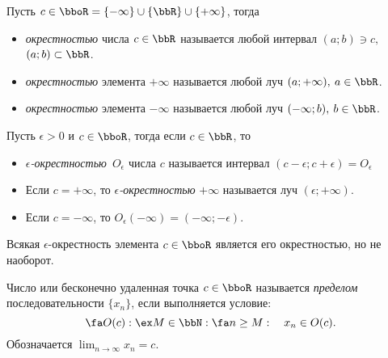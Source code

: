\begin{defn}
Пусть $c \in \bboR = \{-\infty\}\cup\{\bbR\}\cup\{+\infty\}$, тогда 
\begin{itemize}
\item
\textit{окрестностью} числа $c \in \bbR$ называется любой интервал $(a;b)\ni c,$ $(a;b) \subset \bbR$.
\item
\textit{окрестностью} элемента $+\infty$ называется любой луч      $(a;+\infty),\: a \in \bbR$.
\item
\textit{окрестностью} элемента $-\infty$ называется любой луч $(-\infty;b),\: b \in \bbR$.
\end{itemize}
\end{defn}

\begin{defn}
Пусть $\epsilon > 0$ и $c \in \bboR $, тогда если $c \in \bbR$, то
\begin{itemize}
\item
\textit{$\epsilon$-окрестностью}~$O_\epsilon$ числа $c$ называется интервал $(c-\epsilon;c+\epsilon) = O_\epsilon$
\item
Если $c=+\infty$, то \textit{$\epsilon$-окрестностью} $+\infty$ называется луч $(\epsilon;+\infty)$.
\item
Если $c=-\infty$, то $O_\epsilon(-\infty)=(-\infty;-\epsilon)$.
\end{itemize}
\end{defn}
Всякая $\epsilon$-окрестность элемента $c \in \bboR$ является его окрестностью, но не наоборот.

\begin{defn}
Число или бесконечно удаленная точка $c \in \bboR$ называется \textit{пределом} последовательности $\{x_n\}$, если выполняется условие:
$$
\fa O(c): \ex M \in \bbN: \fa n \ge M:\quad x_n \in O(c).
$$
Обозначается $\lim_{n \to \infty}\limits x_n = c$.
\end{defn}

